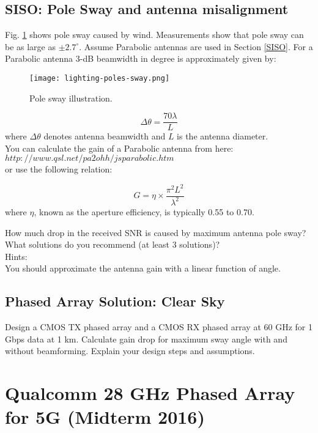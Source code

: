 \documentclass[paper=a4, fontsize=11pt]{scrartcl} %
\numberwithin{equation}{section} %
\numberwithin{figure}{section} %
\numberwithin{table}{section} %
\begin{document}
\subsection{SISO:  Pole Sway and antenna misalignment}
Fig. \ref{Fig4} shows pole sway caused by wind. Measurements show that pole sway can be as large as $\pm2.7^\circ$. Assume Parabolic antennas are used in Section \ref{SISO}. For a Parabolic antenna 3-dB beamwidth in degree is approximately given by:

\begin{figure}[h]
\centering
\texttt{[image: lighting-poles-sway.png]}
\caption{Pole sway illustration.}
\label{Fig4}
\end{figure}


\begin{equation}
\Delta\theta=\frac{70\lambda}{L}
\end{equation}
where $\Delta\theta$ denotes antenna beamwidth and $L$ is the antenna diameter.\\
You can calculate the gain of a Parabolic antenna from here:\\ $http://www.qsl.net/pa2ohh/jsparabolic.htm$
\\ or use the following relation: 

 \begin{equation}
 G=\eta\times\frac{\pi^2L^2}{\lambda^2}
 \end{equation}
 where $\eta$, known as the aperture efficiency, is typically 0.55 to 0.70.


How much drop in the received SNR is caused by maximum antenna pole sway? What solutions do you recommend (at least 3 solutions)?\\

Hints: \\

You should approximate the antenna gain with a linear function of angle.

\subsection{Phased Array Solution: Clear Sky}\label{clear}
 
Design a CMOS TX phased array and a CMOS RX phased array at 60 GHz for 1 Gbps data at 1 km. Calculate gain drop for maximum sway angle with and without beamforming. Explain your design steps and assumptions. 

\section{Qualcomm 28 GHz Phased Array for 5G (Midterm 2016)}
\end{document}
